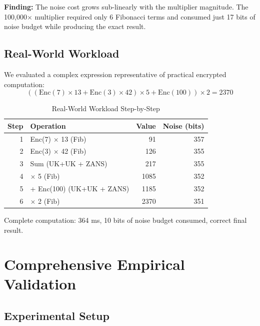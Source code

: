 \documentclass[11pt]{article}
\begin{document}
\textbf{Finding:} The noise cost grows sub-linearly with the multiplier magnitude. The 100,000$\times$ multiplier required only 6 Fibonacci terms and consumed just 17 bits of noise budget while producing the exact result.

\subsection{Real-World Workload}

We evaluated a complex expression representative of practical encrypted computation:
\begin{equation}
((\text{Enc}(7) \times 13 + \text{Enc}(3) \times 42) \times 5 + \text{Enc}(100)) \times 2 = 2370
\end{equation}

\begin{table}[h]
\centering
\caption{Real-World Workload Step-by-Step}
\begin{tabular}{r|l|r|r}
\textbf{Step} & \textbf{Operation} & \textbf{Value} & \textbf{Noise (bits)} \\
\hline
1 & Enc(7) $\times$ 13 (Fib) & 91 & 357 \\
2 & Enc(3) $\times$ 42 (Fib) & 126 & 355 \\
3 & Sum (UK+UK + ZANS) & 217 & 355 \\
4 & $\times$ 5 (Fib) & 1085 & 352 \\
5 & + Enc(100) (UK+UK + ZANS) & 1185 & 352 \\
6 & $\times$ 2 (Fib) & 2370 & 351
\end{tabular}
\end{table}

Complete computation: 364 ms, 10 bits of noise budget consumed, correct final result.

\section{Comprehensive Empirical Validation}

\subsection{Experimental Setup}
\end{document}
